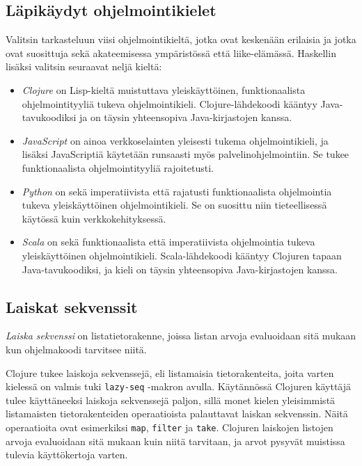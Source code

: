 \subsection{Läpikäydyt ohjelmointikielet}

Valitsin tarkasteluun viisi ohjelmointikieltä, jotka ovat keskenään erilaisia ja jotka ovat suosittuja sekä akateemisessa ympäristössä että liike-elämässä. Haskellin lisäksi valitsin seuraavat neljä kieltä:

\begin{itemize}
\item\textit{Clojure} on Lisp-kieltä muistuttava yleiskäyttöinen, funktionaalista ohjelmointityyliä tukeva ohjelmointikieli. Clojure-lähdekoodi kääntyy Java-tavukoodiksi ja on täysin yhteensopiva Java-kirjastojen kanssa.

\item \textit{JavaScript} on ainoa verkkoselainten yleisesti tukema ohjelmointikieli, ja lisäksi JavaScriptiä käytetään runsaasti myös palvelinohjelmointiin. Se tukee funktionaalista ohjelmointityyliä rajoitetusti.

\item\textit{Python} on sekä imperatiivista että rajatusti funktionaalista ohjelmointia tukeva yleiskäyttöinen ohjelmointikieli. Se on suosittu niin tieteellisessä käytössä kuin verkkokehityksessä.

\item\textit{Scala} on sekä funktionaalista että imperatiivista ohjelmointia tukeva yleiskäyttöinen ohjelmointikieli. Scala-lähdekoodi kääntyy Clojuren tapaan Java-tavukoodiksi, ja kieli on täysin yhteensopiva Java-kirjastojen kanssa.
\end{itemize}

\subsection{Laiskat sekvenssit}

\textit{Laiska sekvenssi} on listatietorakenne, joissa listan arvoja evaluoidaan sitä mukaan kun ohjelmakoodi tarvitsee niitä.

Clojure tukee laiskoja sekvenssejä, eli listamaisia tietorakenteita, joita varten kielessä on valmis tuki \verb!lazy-seq! -makron avulla. Käytännössä Clojuren käyttäjä tulee käyttäneeksi laiskoja sekvenssejä paljon, sillä monet kielen yleisimmistä listamaisten tietorakenteiden operaatioista palauttavat laiskan sekvenssin. Näitä operaatioita ovat esimerkiksi \verb!map!, \verb!filter! ja \verb!take!. Clojuren laiskojen listojen arvoja evaluoidaan sitä mukaan kuin niitä tarvitaan, ja arvot pysyvät muistissa tulevia käyttökertoja varten.

